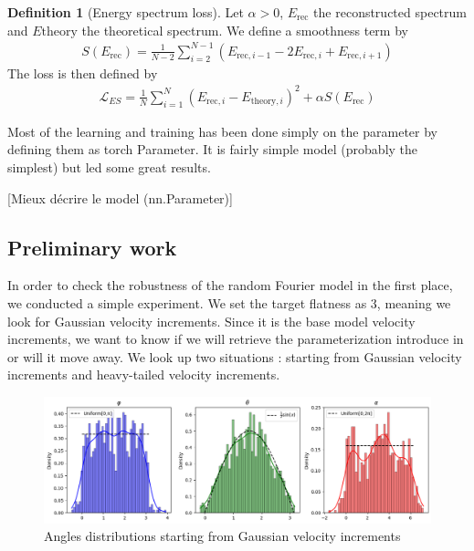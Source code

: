 \documentclass[a4paper,12pt]{article}
\theoremstyle{definition}
\newtheorem{definition}{Definition}
\begin{document}
\begin{definition}[Energy spectrum loss]
    Let $\alpha>0$, $E_\text{rec}$ the reconstructed spectrum and $E\text{theory}$ the theoretical spectrum.
    We define a smoothness term by 
    \begin{align}
        S(E_\text{rec}) = \frac{1}{N-2}\sum_{i=2}^{N-1}\left(E_{\text{rec},i-1} -2E_{\text{rec},i} + E_{\text{rec},i+1}   \right)
    \end{align}
    The loss is then defined by 
    \begin{align}
        \mathcal{L}_{ES} = \frac{1}{N} \sum_{i=1}^{N} (E_{\text{rec},i}-E_{\text{theory},i})^2 + \alpha S(E_\text{rec}) 
    \end{align} 
\end{definition}



\bigskip
Most of the learning and training has been done simply on the parameter by defining them as torch Parameter. It is fairly simple model (probably the simplest) but led some great results. 

[Mieux décrire le model (nn.Parameter)]

\subsection{Preliminary work}
In order to check the robustness of the random Fourier model in the first place, we conducted a simple experiment. We set the target flatness as 3, meaning we look for Gaussian velocity increments. Since it is the base model velocity increments, we want to know if we will retrieve the parameterization introduce in \cite{Janin2021} or will it move away. We look up two situations : starting from Gaussian velocity increments and heavy-tailed velocity increments.

\begin{figure}[H]
    \centering
    \includegraphics[width=1.0\linewidth]{illustrations/StartGaussian.png}
    \caption{Angles distributions starting from Gaussian velocity increments}
\end{figure}
\end{document}
